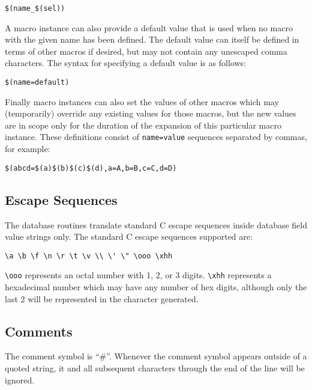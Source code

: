 \begin{verbatim}
$(name_$(sel))
\end{verbatim}

A macro instance can also provide a default value that is used when no macro with the given name has been defined.
The default value can itself be defined in terms of other macros if desired, but may not contain any unescaped comma characters.
The syntax for specifying a default value is as follows:

\begin{verbatim}
$(name=default)
\end{verbatim}

Finally macro instances can also set the values of other macros which may (temporarily) override any existing values for those macros, but the new values are in scope only for the duration of the expansion of this particular macro instance.
These definitions consist of \verb|name=value| sequences separated by commas, for example:

\begin{verbatim}
$(abcd=$(a)$(b)$(c)$(d),a=A,b=B,c=C,d=D)
\end{verbatim}

\subsection{Escape Sequences}
\label{subsec:Escape Sequences}

The database routines translate standard C escape sequences inside database field value strings only.
The standard C escape sequences supported are:

\begin{verbatim}
\a \b \f \n \r \t \v \\ \' \" \ooo \xhh
\end{verbatim}

\verb|\ooo| represents an octal number with 1, 2, or 3 digits.
\verb|\xhh| represents a hexadecimal number which may have any number of hex digits, although only the last 2 will be represented in the character generated.

\subsection{Comments}

The comment symbol is ``\#''.
Whenever the comment symbol appears outside of a quoted string, it and all subsequent characters through the end of the line will be ignored.

